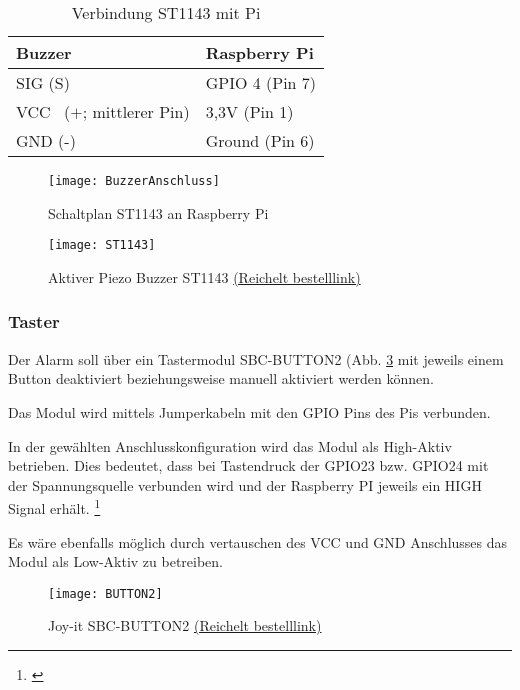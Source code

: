 \documentclass[a4paper,12pt]{article}
\begin{document}
	\begin{table}[H]
		\centering
		\begin{tabular}{|p{5cm}|p{5cm}|} 
			\hline
			Buzzer & Raspberry Pi\\ 
			\hline
			SIG (S)   & GPIO 4 \hspace{0,1cm}(Pin 7)\\  
			\hline
			VCC~ ($+$; mittlerer Pin)   & 3,3V 	\hspace{0,7cm}(Pin 1)\\
			\hline
			GND (-)    & Ground  	\hspace{0,2cm}(Pin 6)\\
			\hline
		\end{tabular}
	\caption{Verbindung ST1143 mit Pi}
	\end{table} 

	
	\begin{figure}[H]
	\centering
	\texttt{[image: BuzzerAnschluss]}
	\caption{Schaltplan ST1143 an Raspberry Pi}
	\label{BuzzerAnschluss}
	\end{figure}

	\begin{figure}[H]	%
	\centering
	\texttt{[image: ST1143]}
	\caption{Aktiver Piezo Buzzer ST1143 \href{https://www.reichelt.de/sg/de/entwicklerboards-summer-aktiv-debo-buzzer-a2-p282660.html}{(Reichelt bestelllink)}}
	\label{ST1143}
	\end{figure}



\subsubsection{Taster}

Der Alarm soll über ein Tastermodul SBC-BUTTON2 (Abb. \ref{BUTTON2} mit jeweils einem Button deaktiviert beziehungsweise manuell aktiviert werden können.\par
Das Modul wird mittels Jumperkabeln mit den GPIO Pins des Pis verbunden. \par
In der gewählten Anschlusskonfiguration wird das Modul als High-Aktiv betrieben. Dies bedeutet, dass bei Tastendruck der GPIO23 bzw. GPIO24 mit der Spannungsquelle verbunden wird und der Raspberry PI jeweils ein HIGH Signal erhält. \footnote{\cite{.19.04.2022}}\par 
Es wäre ebenfalls möglich durch vertauschen des VCC und GND Anschlusses das Modul als Low-Aktiv zu betreiben.
	\begin{figure}[h] %
	\centering
	\texttt{[image: BUTTON2]}
	\caption{Joy-it SBC-BUTTON2 \href{https://www.reichelt.de/sg/de/entwicklerboards-2-tasten-modul-debo-button2-p316186.html}{(Reichelt bestelllink)}}
	\label{BUTTON2}
\end{figure}
\end{document}

